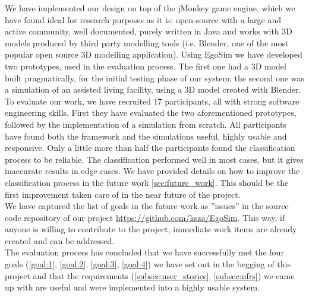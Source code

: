 We have implemented our design on top of the jMonkey game engine, which we have found ideal for research purposes as it is: open-source with a large and active community, well documented, purely written in Java and works with 3D models produced by third party modelling tools (i.e. Blender, one of the most popular open source 3D modelling application). Using EgoSim we have developed two prototypes, used in the evaluation process. The first one had a 3D model built pragmatically, for the initial testing phase of our system; the second one was a simulation of an assisted living facility, using a 3D model created with Blender.\\

To evaluate our work, we have recruited 17 participants, all with strong software engineering skills. First they have evaluated the two aforementioned prototypes, followed by the implementation of a simulation from scratch. All participants have found both the framework and the simulations useful, highly usable and responsive. Only a little more than half the participants found the classification process to be reliable. The classification performed well in most cases, but it gives inaccurate results in edge cases. We have provided details on how to improve the classification process in the future work \ref{sec:future_work}. This should be the first improvement taken care of in the near future of the project.\\

We have captured the list of goals in the future work as ''issues'' in the source code repository of our project \url{https://github.com/ksza/EgoSim}. This way, if anyone is willing to contribute to the project, immediate work items are already created and can be addressed.\\

The evaluation process has concluded that we have successfully met the four goals (\ref{goal:1}, \ref{goal:2}, \ref{goal:3}, \ref{goal:4}) we have set out in the begging of this project and that the requirements (\ref{subsec:user_stories}, \ref{subsec:nfrs}) we came up with are useful and were implemented into a highly usable system.\\




